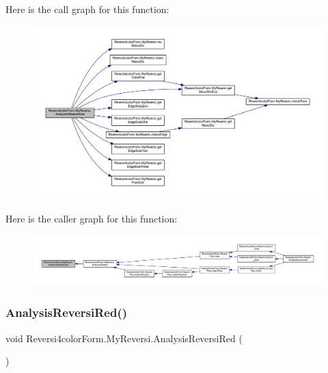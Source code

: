 Here is the call graph for this function\+:\nopagebreak
\begin{figure}[H]
\begin{center}
\leavevmode
\includegraphics[width=350pt]{class_reversi4color_form_1_1_my_reversi_a07c18a7adbcc3bd0993673f0a8f63c85_cgraph}
\end{center}
\end{figure}
Here is the caller graph for this function\+:\nopagebreak
\begin{figure}[H]
\begin{center}
\leavevmode
\includegraphics[width=350pt]{class_reversi4color_form_1_1_my_reversi_a07c18a7adbcc3bd0993673f0a8f63c85_icgraph}
\end{center}
\end{figure}
\mbox{\label{class_reversi4color_form_1_1_my_reversi_a2d0c12ed7036def583e06ca4df37f367}} 
\subsubsection{\texorpdfstring{Analysis\+Reversi\+Red()}{AnalysisReversiRed()}}
{\footnotesize\ttfamily void Reversi4color\+Form.\+My\+Reversi.\+Analysis\+Reversi\+Red (\begin{DoxyParamCaption}{ }\end{DoxyParamCaption})\hspace{0.3cm}{\ttfamily [private]}}



